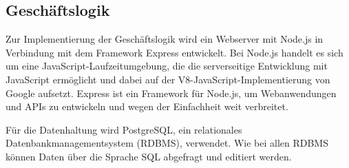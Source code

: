 \subsection{Geschäftslogik}
Zur Implementierung der Geschäftslogik wird ein Webserver mit Node.js in Verbindung mit dem Framework Express entwickelt.
Bei Node.js handelt es sich um eine JavaScript-Laufzeitumgebung, die die serverseitige Entwicklung mit JavaScript ermöglicht und dabei auf der V8-JavaScript-Implementierung von Google aufsetzt.\autocite[Vgl.][]{nl-openjsfoundation2020nodejs}
Express ist ein Framework für Node.js, um Webanwendungen und \acsp{API} zu entwickeln und wegen der Einfachheit weit verbreitet.\autocite[Vgl.][]{nl-strongloop2017express}

Für die Datenhaltung wird PostgreSQL, ein relationales Datenbankmanagementsystem (RDBMS), verwendet. %
Wie bei allen RDBMS können Daten über die Sprache \acs{SQL} abgefragt und editiert werden.